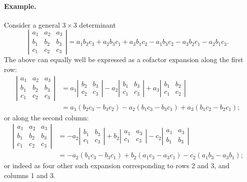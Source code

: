 \documentclass{article}
\begin{document}
\paragraph{Example.}
Consider a general $3\times 3$ determinant
$$
\left|
\begin{matrix}
a_1 & a_2 & a_3 \\
b_1 & b_2 & b_3 \\
c_1 & c_2 & c_3
\end{matrix}
\right|= a_1 b_2 c_3 + a_2 b_3 c_1 + a_3 b_1 c_2 - a_1 b_3 c_2 - a_3
b_2 c_1 - a_2 b_1 c_3.
$$
The above can equally well be expressed as a cofactor expansion along
the first row:
\begin{align*}
\left|\begin{matrix}
a_1 & a_2 & a_3 \\
b_1 & b_2 & b_3 \\
c_1 & c_2 & c_3
\end{matrix}
\right| &=
a_1 \left| \begin{matrix} b_2 & b_3 \\ c_2 & c_3 \end{matrix}\right|
-
a_2 \left| \begin{matrix} b_1 & b_3 \\ c_1 & c_3 \end{matrix}\right|
+
a_3 \left| \begin{matrix} b_1 & b_2 \\ c_1 & c_2
\end{matrix}\right|\\
&= a_1(b_2 c_3-b_3 c_2) - a_2(b_1 c_3 - b_3 c_1) + a_3(b_1 c_2-b_2c_1);
\end{align*}
or along the second column:
\begin{align*}
\left|\begin{matrix}
a_1 & a_2 & a_3 \\
b_1 & b_2 & b_3 \\
c_1 & c_2 & c_3
\end{matrix}
\right| &=
-a_2 \left| \begin{matrix} b_1 & b_3 \\ c_1 & c_3 \end{matrix}\right|
+
b_2 \left| \begin{matrix} a_1 & a_3 \\ c_1 & c_3 \end{matrix}\right|
-
c_2 \left| \begin{matrix} a_1 & a_3 \\ b_1 & b_3
\end{matrix}\right|\\
&= -a_2(b_1 c_3-b_3 c_1) + b_2(a_1 c_3 - a_3 c_1) - c_2(a_1 b_3-a_3 b_1);
\end{align*}
or indeed as four other such expansion corresponding to rows 2 and 3,
and columns 1 and 3.
\end{document}
